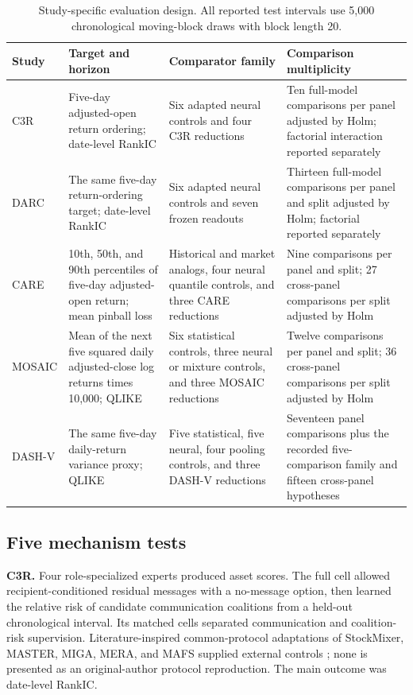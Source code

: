 \documentclass{crebss}
\begin{document}
\begin{table}[htbp]
\centering
\caption{Study-specific evaluation design. All reported test intervals use 5,000 chronological moving-block draws with block length 20.}
\label{tab:design}
\scriptsize
\setlength{\tabcolsep}{2pt}
\begin{tabular}{p{1.3cm}p{4.2cm}p{4.2cm}p{4.2cm}}
\toprule
Study & Target and horizon & Comparator family & Comparison multiplicity \\
\midrule
C3R & Five-day adjusted-open return ordering; date-level RankIC & Six adapted neural controls and four C3R reductions & Ten full-model comparisons per panel adjusted by Holm; factorial interaction reported separately \\
DARC & The same five-day return-ordering target; date-level RankIC & Six adapted neural controls and seven frozen readouts & Thirteen full-model comparisons per panel and split adjusted by Holm; factorial reported separately \\
CARE & 10th, 50th, and 90th percentiles of five-day adjusted-open return; mean pinball loss & Historical and market analogs, four neural quantile controls, and three CARE reductions & Nine comparisons per panel and split; 27 cross-panel comparisons per split adjusted by Holm \\
MOSAIC & Mean of the next five squared daily adjusted-close log returns times 10,000; QLIKE & Six statistical controls, three neural or mixture controls, and three MOSAIC reductions & Twelve comparisons per panel and split; 36 cross-panel comparisons per split adjusted by Holm \\
DASH-V & The same five-day daily-return variance proxy; QLIKE & Five statistical, five neural, four pooling controls, and three DASH-V reductions & Seventeen panel comparisons plus the recorded five-comparison family and fifteen cross-panel hypotheses \\
\bottomrule
\end{tabular}
\end{table}

\subsection{Five mechanism tests}

\textbf{C3R.} Four role-specialized experts produced asset scores. The full cell allowed recipient-conditioned residual messages with a no-message option, then learned the relative risk of candidate communication coalitions from a held-out chronological interval. Its matched cells separated communication and coalition-risk supervision. Literature-inspired common-protocol adaptations of StockMixer, MASTER, MIGA, MERA, and MAFS supplied external controls \citep{fan2024stockmixer,li2024master,yu2024miga,liu2025mera,huang2025mafs}; none is presented as an original-author protocol reproduction. The main outcome was date-level RankIC.
\end{document}
